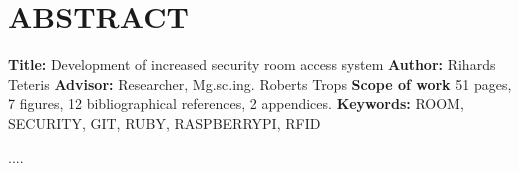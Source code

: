 \chapter*{ABSTRACT}
\noindent \textbf{Title:} Development of increased security room access system\newline
\textbf{Author:} Rihards Teteris\newline
\textbf{Advisor:} Researcher, Mg.sc.ing. Roberts Trops\newline
\textbf{Scope of work} 51 pages, 7 figures, 12 bibliographical references, 2 appendices.\newline
\textbf{Keywords:} ROOM, SECURITY, GIT, RUBY, RASPBERRYPI, RFID\newline

....
